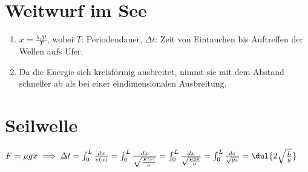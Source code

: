 \documentclass{article}
\begin{document}
\section{Weitwurf im See}
\begin{enumerate}[label=\alph*)]
    \item $x = \frac{\lambda \Delta t}{T}$, wobei $T$: Periodendauer, $\Delta t$: Zeit von Eintauchen bis Auftreffen der Wellen aufs Ufer. 
    \item Da die Energie sich kreisförmig ausbreitet, nimmt sie mit dem Abstand schneller ab als bei einer eindimensionalen Ausbreitung.
\end{enumerate}

\section{Seilwelle}
$F = \mu g x  \implies \Delta t = \int_{0}^{L} \frac{dx}{v(x)} = \int_{0}^{L} \frac{dx}{\sqrt{\frac{F(x)}{\mu}}} = \int_{0}^{L} \frac{dx}{\sqrt{\frac{\mu g x}{\mu}}} = \int_{0}^{L} \frac{dx}{\sqrt{gx}} = \dul{2\sqrt{\frac{L}{g}}}$
\end{document}
